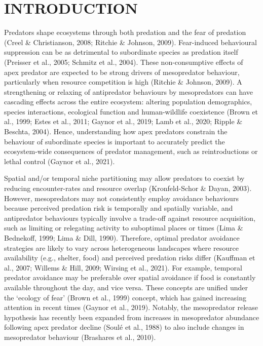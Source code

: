 \documentclass[]{elsarticle} %
\begin{document}
\newpage

\hypertarget{introduction}{%
\section{INTRODUCTION}\label{introduction}}

Predators shape ecosystems through both predation and the fear of predation (Creel \& Christianson, 2008; Ritchie \& Johnson, 2009). Fear-induced behavioural suppression can be as detrimental to subordinate species as predation itself (Preisser et al., 2005; Schmitz et al., 2004). These non-consumptive effects of apex predator are expected to be strong drivers of mesopredator behaviour, particularly when resource competition is high (Ritchie \& Johnson, 2009). A strengthening or relaxing of antipredator behaviours by mesopredators can have cascading effects across the entire ecosystem: altering population demographics, species interactions, ecological function and human-wildlife coexistence (Brown et al., 1999; Estes et al., 2011; Gaynor et al., 2019; Lamb et al., 2020; Ripple \& Beschta, 2004). Hence, understanding how apex predators constrain the behaviour of subordinate species is important to accurately predict the ecosystem-wide consequences of predator management, such as reintroductions or lethal control (Gaynor et al., 2021).

Spatial and/or temporal niche partitioning may allow predators to coexist by reducing encounter-rates and resource overlap (Kronfeld-Schor \& Dayan, 2003). However, mesopredators may not consistently employ avoidance behaviours because perceived predation risk is temporally and spatially variable, and antipredator behaviours typically involve a trade-off against resource acquisition, such as limiting or relegating activity to suboptimal places or times (Lima \& Bednekoff, 1999; Lima \& Dill, 1990). Therefore, optimal predator avoidance strategies are likely to vary across heterogeneous landscapes where resource availability (e.g., shelter, food) and perceived predation risks differ (Kauffman et al., 2007; Willems \& Hill, 2009; Wirsing et al., 2021). For example, temporal predator avoidance may be preferable over spatial avoidance if food is constantly available throughout the day, and vice versa. These concepts are unified under the `ecology of fear' (Brown et al., 1999) concept, which has gained increasing attention in recent times (Gaynor et al., 2019). Notably, the mesopredator release hypothesis has recently been expanded from increases in mesopredator abundance following apex predator decline (Soulé et al., 1988) to also include changes in mesopredator behaviour (Brashares et al., 2010).
\end{document}
